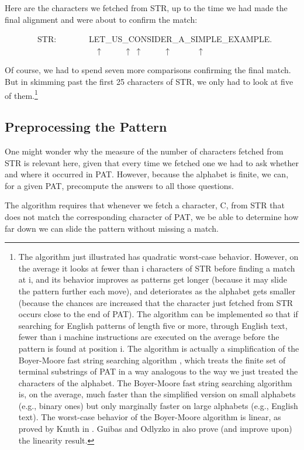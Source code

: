 \documentclass[10pt]{book}
\newenvironment{pubasis}{\begin{flushleft}}{\end{flushleft}}
\begin{document}
Here are the characters we fetched from STR, up to the time we had
made the final alignment and were about to confirm the match:
\begin{pubasis}
~~~~~~~~STR:~~~~~~~~LET\_US\_CONSIDER\_A\_SIMPLE\_EXAMPLE.\\
~~~~~~~~~~~~~~~~~~~~~~$\uparrow$~~~~~$\uparrow~\uparrow$~~~~~$\uparrow$~~~~~~$\uparrow$\\
\end{pubasis}
Of course, we had to spend seven more comparisons confirming the final match.
But in skimming past the first 25 characters of STR, we only had to look
at five of them.\footnote{The algorithm just illustrated has quadratic worst-case behavior. However, on the average it looks at fewer than i characters of STR before finding a match at i, and its behavior improves as patterns get longer (because it may slide the pattern further each move), and deteriorates as the alphabet gets smaller (because the chances are increased that the character just fetched from STR occurs close to the end of PAT). The algorithm can be implemented so that if searching for English patterns of length five or more, through English text, fewer than i machine instructions are executed on the average before the pattern is found at position i. The algorithm is actually a simplification of the Boyer-Moore fast string searching algorithm \cite{FSTRPOS}, which treats the finite set of terminal substrings of PAT in a way analogous to the way we just treated the characters of the alphabet.  The Boyer-Moore fast string searching algorithm is, on the average, much faster than the simplified version on small alphabets (e.g., binary ones) but only marginally faster on large alphabets (e.g., English text). The worst-case behavior of the Boyer-Moore algorithm is linear, as proved by Knuth in \cite{KMP}.  Guibas and Odlyzko in \cite{GUIBAS} also prove (and improve upon) the linearity result.}

\subsection{Preprocessing the Pattern}
One might wonder why the measure of the number of characters fetched
from STR is relevant here, given that every time we fetched one
we had to ask whether and where it occurred in PAT.  However,
because the alphabet is finite, we can, for a given PAT, precompute the
answers to all those questions.

The algorithm requires that whenever we fetch a character, C, from
STR that does not match the corresponding character of PAT, we be able
to determine how far down we can slide the pattern without missing
a match.
\end{document}
